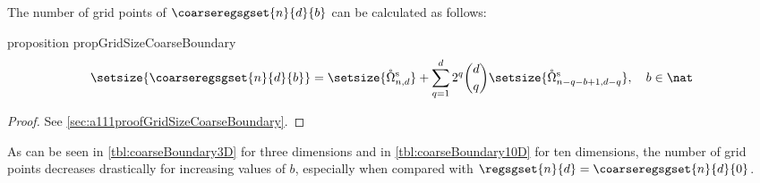 The number of grid points of $\coarseregsgset{n}{d}{b}$
can be calculated as follows:
\begin{restatable}{%
  proposition%
}{%
  propGridSizeCoarseBoundary%
}
  \label{prop:gridSizeCoarseBoundary}
  \setlength{\abovedisplayskip}{0pt}
  \begin{equation}
    \setsize{\coarseregsgset{n}{d}{b}}
    = \setsize{\interiorregsgset{n}{d}} +
    \sum_{q=1}^d 2^q \binom{d}{q}
    \setsize{\interiorregsgset{n-q-b+1}{d-q}},\quad
    b \in \nat
  \end{equation}
\end{restatable}
\begin{proof}
  See \cref{sec:a111proofGridSizeCoarseBoundary}.
\end{proof}
As can be seen in \cref{tbl:coarseBoundary3D} for three dimensions and
in \cref{tbl:coarseBoundary10D} for ten dimensions,
the number of grid points decreases drastically for increasing values
of $b$, especially when compared with
$\regsgset{n}{d} = \coarseregsgset{n}{d}{0}$.

